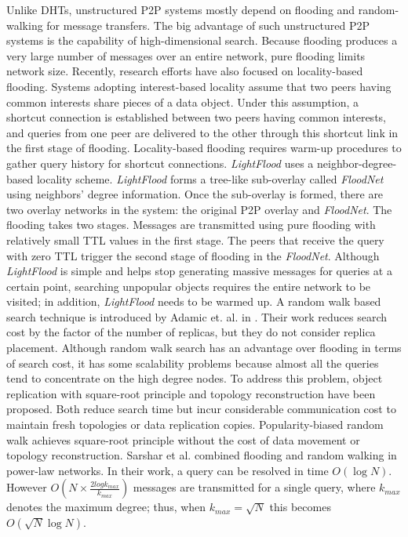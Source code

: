 \documentclass[conference]{IEEEtran}
\begin{document}
Unlike DHTs, unstructured P2P systems mostly depend on flooding and random-walking 
for message transfers. The big advantage of such unstructured P2P systems 
is the capability of high-dimensional search.
Because flooding produces a very large number of
messages over an entire network, pure flooding limits network size. 
Recently, research efforts have also focused on locality-based flooding. Systems 
adopting interest-based locality\cite{Guo05,SMZ03} assume that 
two peers having common interests share pieces of a data object. 
Under this assumption, a shortcut 
connection is established between two peers having common interests, 
and queries from one peer are delivered to the other through this 
shortcut link in the first stage of flooding. 
Locality-based flooding requires warm-up procedures to gather query 
history for shortcut connections. 
\textit{LightFlood}\cite{JiangGZW08} uses a neighbor-degree-based locality scheme. 
\textit{LightFlood} forms a tree-like sub-overlay called 
\textit{FloodNet} using neighbors' degree information. Once the sub-overlay 
is formed, there are two overlay networks in the system: the original 
P2P overlay and \textit{FloodNet}. The flooding takes two stages.
Messages are transmitted using pure flooding with relatively small TTL values 
in the first stage. The peers that receive the query with zero TTL trigger 
the second stage of flooding in the \textit{FloodNet}. Although 
\textit{LightFlood} is simple and helps stop generating massive messages 
for queries at a certain point, searching unpopular objects requires  
the entire network to be visited; in addition, \textit{LightFlood} needs to 
be warmed up.  
A random walk based search technique is introduced by Adamic et. al. 
in \cite{alph:powerlaw01}. 
Their work reduces search cost by the factor of the number of replicas, 
but they do not consider replica placement. 
Although random walk search has an advantage over flooding
in terms of search cost, it has some
scalability problems because almost all the queries tend to concentrate
on the high degree nodes. To address this problem, object
replication with square-root principle\cite{CohenS02,LCKS02}
and topology reconstruction\cite{Cooper05} have been proposed. 
Both reduce search time but incur considerable communication cost 
to maintain fresh topologies or data replication copies. 
Popularity-biased random walk\cite{zs:popularity06}
achieves square-root principle without the cost of data movement or
topology reconstruction. Sarshar et al. \cite{ns:percolation}
combined flooding and random walking in power-law networks. In their
work, a query can be resolved in time $O(\log N)$. However
$O(N\times \frac{2log k_{max}}{k_{max}})$ messages are
transmitted for a single query, where $k_{max}$ denotes the maximum
degree; thus, when $k_{max} = \sqrt{N}$ this becomes $O(\sqrt N \log N)$.
\end{document}

